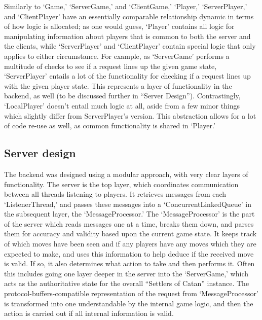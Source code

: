 \documentclass[a4paper,doc,draftfirst]{apa6}
\begin{document}
Similarly to ‘Game,’ ‘ServerGame,’ and ‘ClientGame,’ ‘Player,’ ‘ServerPlayer,’ and ‘ClientPlayer’ have an essentially comparable relationship dynamic in terms of how logic is allocated; as one would guess, ‘Player’ contains all logic for manipulating information about players that is common to both the server and the clients, while ‘ServerPlayer’ and ‘ClientPlayer’ contain special logic that only applies to either circumstance. For example, as ‘ServerGame’ performs a multitude of checks to see if a request lines up the given game state, ‘ServerPlayer’ entails a lot of the functionality for checking if a request lines up with the given player state. This represents a layer of functionality in the backend, as well (to be discussed further in “Server Design”). Contrastingly, ‘LocalPlayer’ doesn’t entail much logic at all, aside from a few minor things which slightly differ from ServerPlayer’s version. This abstraction allows for a lot of code re-use as well, as common functionality is shared in ‘Player.’

\subsection{Server design}
The backend was designed using a modular approach, with very clear layers of functionality. The server is the top layer, which coordinates communication between all threads listening to players. It retrieves messages from each ‘ListenerThread,’ and passes these messages into a ‘ConcurrentLinkedQueue’ in the subsequent layer, the ‘MessageProcessor.’ The ‘MessageProcessor’ is the part of the server which reads messages one at a time, breaks them down, and parses them for accuracy and validity based upon the current game state. It keeps track of which moves have been seen and if any players have any moves which they are expected to make, and uses this information to help deduce if the received move is valid. If so, it also determines what action to take and then performs it. Often this includes going one layer deeper in the server into the ‘ServerGame,’ which acts as the authoritative state for the overall “Settlers of Catan” instance. The protocol-buffers-compatible representation of the request from ‘MessageProcessor’ is transformed into one understandable by the internal game logic, and then the action is carried out if all internal information is valid.
\end{document}
